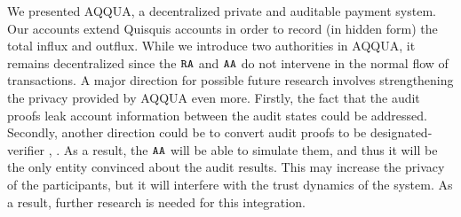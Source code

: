 We presented AQQUA, a decentralized private and auditable payment system. 
Our accounts extend Quisquis accounts in order to record (in hidden form) the total influx and outflux.
While we introduce two authorities in AQQUA, it remains decentralized since the $\RA$ and $\AA$ do not intervene in the normal flow of transactions.
A major direction for possible future research involves strengthening the privacy provided by AQQUA even more.
Firstly, the fact that the audit proofs leak account information between the audit states could be addressed. 
Secondly, another direction could be to convert audit proofs to be designated-verifier \cite{DVP} \cite{DBLP:conf/cai/UDVLRS}, \cite{BGKPS}.
As a result, the $\AA$ will be able to simulate them, and thus it will be the only entity convinced about the audit results. 
This may increase the privacy of the participants, but it will interfere with the trust dynamics of the system. 
As a result, further research is needed for this integration. 

